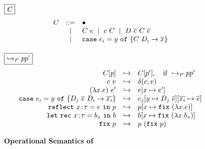 \begin{figure}[t!]
\centering

\hfill{{$\fbox{\textit{C}}$}}
$$
\begin{array}{rcl}
  C & ::=    & \bullet \\
    & \spmid & C\ e \spmid c\ C \spmid D\ \overline{e}\ C\ \overline{e}\\
    & \spmid & \ecase{y}{C}{\dc_i}{\overline{x}}{e_i}
  \\[0.03in]
\end{array}
$$

\hfill{{$\fbox{\goesto{\prog}{\prog'}}$}}
$$
\begin{array}{rcl}
C[\prog]
  & \hookrightarrow
  & C[\prog'],\quad \text{if}\ \goesto{\prog}{\prog'}
  \\
{c\ v}
  & \hookrightarrow
  & {\ceval{c}{v}}
  \\
{({\efun{x}{\typ}{e})}\ {e'}}
  & \hookrightarrow
  & {\SUBST{e}{x}{e'}}
  \\
{\ecase{y}{\dc_j\ \overline{e}}{\dc_i}{\overline{x_i}}{e_i}}
  & \hookrightarrow
  & {\SUBST{\SUBST{e_j}{y}{\dc_j\ \overline{e}}}{\overline{x_i}}{\overline{e}}}
  \\
{\erefb{x}{\gtyp}{e}{\prog}}
  & \hookrightarrow
  & {\SUBST{\prog}{x}{\efix{(\efun{x}{\gtyp}{e})}}}
  \\
{\eletb{x}{\gtyp}{\bd_x}{\bd}}
  & \hookrightarrow
  & {\SUBST{\bd}{x}{\efix{(\efun{x}{\gtyp}{\bd_x})}}}
  \\
{\efix{\prog}}
  & \hookrightarrow
  & {\prog\ (\efix{\prog})}
\end{array}
$$
\caption{\textbf{Operational Semantics of \corelan}}
\label{fig:semantics}
\end{figure}
